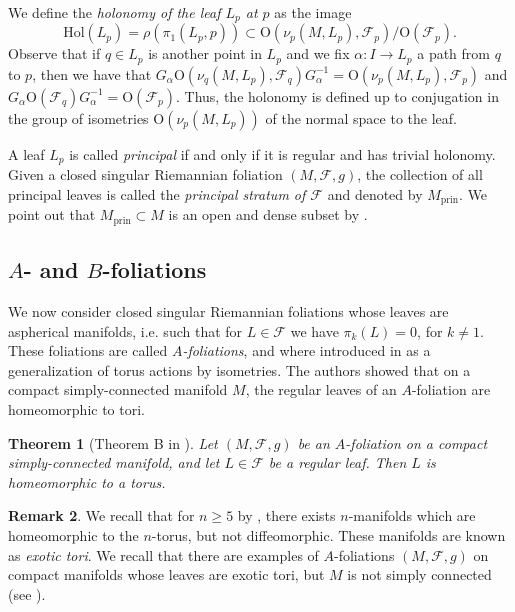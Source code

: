 \documentclass[12pt,a4paper,reqno]{amsart}
\newtheorem{theorem}{Theorem}[section]
\theoremstyle{definition}
\newtheorem{rmk}[theorem]{Remark}
\numberwithin{equation}{section}
\newcommand{\fol}{\mathcal{F}}
\newcommand{\Hol}{\mathrm{Hol}}
\newcommand{\Or}{\mathrm{O}}
\newcommand{\prin}{\mathrm{prin}}
\begin{document}
We define the \emph{holonomy of the leaf $L_p$ at $p$} as the image 
\[
\Hol(L_p) = \rho(\pi_1(L_p,p))\subset \Or(\nu_p(M,L_p),\fol_p)/\Or(\fol_p).
\]
Observe that if $q\in L_p$ is another point in $L_p$ and we fix $\alpha\colon I\to L_p$ a path from $q$ to $p$, then we have that $G_{\alpha}\Or(\nu_q(M,L_p),\fol_q)G_{\alpha}^{-1} = \Or(\nu_p(M,L_p),\fol_p)$ and $G_{\alpha}\Or(\fol_q)G_{\alpha}^{-1} = \Or(\fol_p)$. Thus, the holonomy is defined up to conjugation in the group of isometries $\Or(\nu_p(M,L_p))$ of the normal space to the leaf.

A leaf $L_p$ is called \emph{principal} if and only if it is regular and has trivial holonomy. Given a closed singular Riemannian foliation $(M,\fol,g)$, the collection of all principal leaves is called the \emph{principal stratum of $\fol$} and denoted by $M_{\prin}$. We point out that $M_{\prin}\subset M$ is an open and dense subset by \cite[Proposition 2.8]{Corro2023}.

\subsection{\texorpdfstring{$A$}{A}- and \texorpdfstring{$B$}{B}-foliations}

We now consider closed singular Riemannian foliations whose leaves are aspherical manifolds, i.e. such that for $L\in\fol$ we have $\pi_k(L) =0$, for $k\neq 1$. These foliations are called \emph{$A$-foliations}, and where introduced in \cite{GalazGarciaRadeschi2015} as a generalization of torus actions by isometries. The authors showed that on a compact simply-connected manifold $M$, the regular leaves of an $A$-foliation are homeomorphic to tori.

\begin{theorem}[Theorem B in \cite{GalazGarciaRadeschi2015}]\th\label{T: regular leaves are tori}
Let $(M,\fol,g)$ be an $A$-foliation on a compact simply-connected manifold, and let $L\in \fol$ be a regular leaf. Then $L$ is homeomorphic to a torus. 
\end{theorem}

\begin{rmk}
We recall that for $n\geq 5$ by \cite{HsiangShaenson1969}, there  exists $n$-manifolds which are homeomorphic to the $n$-torus, but not diffeomorphic. These manifolds are known as \emph{exotic tori}. We recall that there are examples of $A$-foliations $(M,\fol,g)$ on compact manifolds whose leaves are exotic tori, but $M$ is not simply connected (see \cite{FarrellWu2019}).
\end{rmk}
\end{document}
